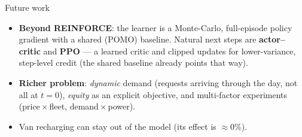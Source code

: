 \documentclass[aspectratio=169,11pt]{beamer}
\begin{document}
\begin{frame}{Future work}
  {\footnotesize
  \begin{itemize}
    \item \textbf{Beyond REINFORCE}: the learner is a Monte-Carlo, full-episode policy gradient with a shared (POMO) baseline. Natural next steps are \textbf{actor--critic} and \textbf{PPO} --- a learned critic and clipped updates for lower-variance, step-level credit (the shared baseline already points that way).
    \item \textbf{Richer problem}: \emph{dynamic} demand (requests arriving through the day, not all at $t=0$), \emph{equity} as an explicit objective, and multi-factor experiments (price\,$\times$\,fleet, demand\,$\times$\,power).
    \item Van recharging can stay out of the model (its effect is $\approx0\%$).
  \end{itemize}}
  \vspace{4pt}
\end{frame}
\end{document}
